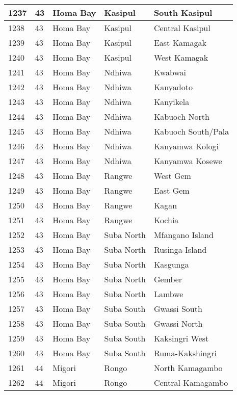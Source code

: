 \begin{table}[!ht]
\begin{tabular}{|l|l|l|l|l|}
        1237 & 43 & Homa Bay & Kasipul & South Kasipul \\ \hline
        1238 & 43 & Homa Bay & Kasipul & Central Kasipul \\ \hline
        1239 & 43 & Homa Bay & Kasipul & East Kamagak \\ \hline
        1240 & 43 & Homa Bay & Kasipul & West Kamagak \\ \hline
        1241 & 43 & Homa Bay & Ndhiwa & Kwabwai \\ \hline
        1242 & 43 & Homa Bay & Ndhiwa & Kanyadoto \\ \hline
        1243 & 43 & Homa Bay & Ndhiwa & Kanyikela \\ \hline
        1244 & 43 & Homa Bay & Ndhiwa & Kabuoch North \\ \hline
        1245 & 43 & Homa Bay & Ndhiwa & Kabuoch South/Pala \\ \hline
        1246 & 43 & Homa Bay & Ndhiwa & Kanyamwa Kologi \\ \hline
        1247 & 43 & Homa Bay & Ndhiwa & Kanyamwa Kosewe \\ \hline
        1248 & 43 & Homa Bay & Rangwe & West Gem \\ \hline
        1249 & 43 & Homa Bay & Rangwe & East Gem \\ \hline
        1250 & 43 & Homa Bay & Rangwe & Kagan \\ \hline
        1251 & 43 & Homa Bay & Rangwe & Kochia \\ \hline
        1252 & 43 & Homa Bay & Suba North & Mfangano Island \\ \hline
        1253 & 43 & Homa Bay & Suba North & Rusinga Island \\ \hline
        1254 & 43 & Homa Bay & Suba North & Kasgunga \\ \hline
        1255 & 43 & Homa Bay & Suba North & Gember \\ \hline
        1256 & 43 & Homa Bay & Suba North & Lambwe \\ \hline
        1257 & 43 & Homa Bay & Suba South & Gwassi South \\ \hline
        1258 & 43 & Homa Bay & Suba South & Gwassi North \\ \hline
        1259 & 43 & Homa Bay & Suba South & Kaksingri West \\ \hline
        1260 & 43 & Homa Bay & Suba South & Ruma-Kakshingri \\ \hline
        1261 & 44 & Migori & Rongo & North Kamagambo \\ \hline
        1262 & 44 & Migori & Rongo & Central Kamagambo \\ \hline

\end{tabular}
\end{table}
